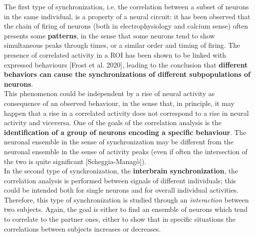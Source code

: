 \documentclass[a4paper]{article}
\begin{document}
The first type of synchronization, i.e. the correlation between a subset of neurons in the same individual, is a property of a neural circuit: it has been observed that the chain of firing of neurons (both in electrophysiology and calcium sense) often presents some \textbf{patterns}, in the sense that some neurons tend to show simultaneous peaks through times, or a similar order and timing of firing. The presence of correlated activity in a ROI has been shown to be linked with expressed behaviours [Frost et al. 2020], leading to the conclusion that \textbf{different behaviors can cause the synchronizations of different  subpopulations of neurons}.\\
This phenomenon could be independent by a rise of neural activity as consequence of an observed behaviour, in the sense that, in principle, it may happen that a rise in a correlated activity does not correspond to a rise in neural activity and viceversa. One of the goals of the correlation analysis is the \textbf{identification of a group of neurons encoding a specific behaviour}. The neuronal ensemble in the sense of synchronization may be different from the neuronal ensemble in the sense of activity peaks (even if often the intersection of the two is quite significant [Scheggia-Managò]).\\
In the second type of synchronization, the \textbf{interbrain synchronization}, the correlation analysis is performed between signals of different individuals; this could be intended both for single neurons and for  overall individual activities. Therefore, this type of synchronization is studied through an \textit{interaction} between two subjects. Again, the goal is either to find an ensemble of neurons which tend to correlate to the partner ones, either to show that in specific situations the correlations between subjects increases or decreases.\\
\end{document}
